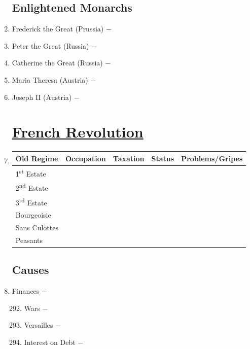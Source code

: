 \documentclass[12pt]{article}
\begin{document}
\begin{enumerate}
\subsection{Enlightened Monarchs}

\item Frederick the Great (Prussia) $-$ 

\item Peter the Great (Russia) $-$

\item Catherine the Great (Russia) $-$ 

\item Maria Theresa (Austria) $-$ 

\item Joseph II (Austria) $-$


\section{\underline{French Revolution}} 

\item \begin{tabular}{l c c c c}

Old Regime & Occupation & Taxation & Status & Problems/Gripes\\
\hline
1\textsuperscript{st} Estate & & & & \\
\hline
2\textsuperscript{nd} Estate & & & & \\
\hline
3\textsuperscript{rd} Estate & & & & \\
\hline
Bourgeoisie & & & & \\
\hline
Sans Culottes & & & & \\
\hline
Peasants & & & & \\
\hline

\end{tabular}

\subsection{Causes}

\item Finances $-$

\begin{enumerate}[label=\arabic{*}.]
\setcounter{enumii}{291}

\item Wars $-$

\item Versailles $-$

\item Interest on Debt $-$ 


\end{enumerate}
\end{enumerate}
\end{document}
